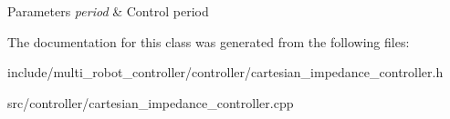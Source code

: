 \begin{DoxyParams}{Parameters}
{\em period} & Control period \\
\hline
\end{DoxyParams}


The documentation for this class was generated from the following files\+:\begin{DoxyCompactItemize}
\item 
include/multi\+\_\+robot\+\_\+controller/controller/cartesian\+\_\+impedance\+\_\+controller.\+h\item 
src/controller/cartesian\+\_\+impedance\+\_\+controller.\+cpp\end{DoxyCompactItemize}
